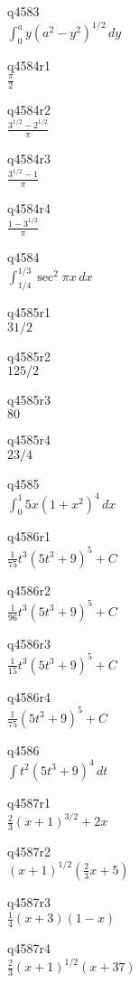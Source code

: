 q4583\\
\(\displaystyle \int_0^a y(a^2 - y^2)^{1/2}\,dy \)

q4584r1\\
\(\displaystyle \frac{\pi}{2} \)

q4584r2\\
\(\displaystyle \frac{3^{1/2} - 2^{1/2}}{\pi} \)

q4584r3\\
\(\displaystyle \frac{3^{1/2} - 1}{\pi} \)

q4584r4\\
\(\displaystyle \frac{1 - 3^{1/2}}{\pi} \)

q4584\\
\(\displaystyle \int_{1/4}^{1/3} \sec^2 \pi x \, dx \)

q4585r1\\
\(\displaystyle 31/2 \)

q4585r2\\
\(\displaystyle 125/2 \)

q4585r3\\
\(\displaystyle 80 \)

q4585r4\\
\(\displaystyle 23/4 \)

q4585\\
\(\displaystyle \int_0^1 5x (1 + x^2)^4 \, dx \)

q4586r1\\
\(\displaystyle \frac{1}{75} t^3 (5t^3 + 9)^5 + C \)

q4586r2\\
\(\displaystyle \frac{1}{96} t^3 (5t^3 + 9)^5 + C \)

q4586r3\\
\(\displaystyle \frac{1}{15} t^3 (5t^3 + 9)^5 + C \)

q4586r4\\
\(\displaystyle \frac{1}{75} (5t^3 + 9)^5 + C \)

q4586\\
\(\displaystyle \int t^2 (5t^3 + 9)^4\,dt \)

q4587r1\\
\(\displaystyle \frac{2}{3} (x+1)^{3/2} + 2x \)

q4587r2\\
\(\displaystyle (x+1)^{1/2} \left ( \frac{2}{3} x + 5 \right ) \)

q4587r3\\
\(\displaystyle \frac{1}{4} (x+3)(1 - x) \)

q4587r4\\
\(\displaystyle \frac{2}{3} (x+1)^{1/2} (x+37) \)

